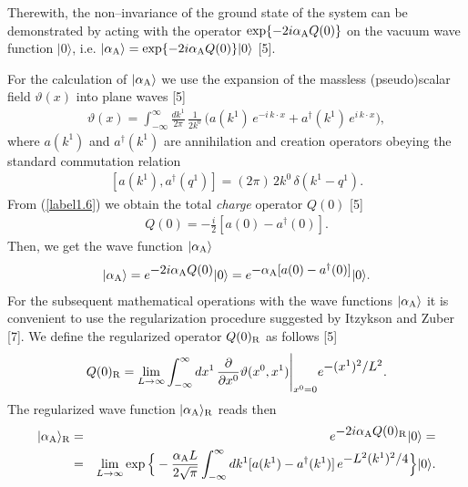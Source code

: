 \documentclass[a4paper,12pt] {article}
\begin{document}
Therewith, the non--invariance of the ground state of the system can
be demonstrated by acting with the operator $\exp\{-2i\alpha_{\rm
A}Q(0)\}$ on the vacuum wave function $|0\rangle$, i.e. $|\alpha_{\rm
A}\rangle = \exp\{-2i\alpha_{\rm A}Q(0)\}|0\rangle$ [5].

For the calculation of $|\alpha_{\rm A}\rangle$ we use the expansion
of the massless (pseudo)scalar field $\vartheta(x)$ into plane waves
[5]
%
\begin{eqnarray}\label{label1.7}
\vartheta(x) =
\int^{\infty}_{-\infty}\frac{dk^1}{2\pi}\,\frac{1}{2k^0}\,
\Big(a(k^1)\,e^{\textstyle -i\,k\cdot x} +
a^{\dagger}(k^1)\,e^{\textstyle i\,k\cdot x}\Big),
\end{eqnarray}
%
where $a(k^1)$ and $a^{\dagger}(k^1)$ are annihilation and creation
operators obeying the standard commutation relation
%
\begin{eqnarray}\label{label1.8}
[a(k^1), a^{\dagger}(q^1)] = (2\pi)\,2k^0\,\delta(k^1 - q^1).
\end{eqnarray}
%
From (\ref{label1.6}) we obtain the total {\it charge} operator $Q(0)$
[5]
%
\begin{eqnarray}\label{label1.9}
Q(0) = -\frac{i}{2}[a(0) - a^{\dagger}(0)].
\end{eqnarray}
%
Then, we get the wave function $|\alpha_{\rm A}\rangle$
%
\begin{eqnarray}\label{label1.10}
|\alpha_{\rm A}\rangle = e^{\textstyle -2i\alpha_{\rm A}Q(0)}|0\rangle
  = e^{\textstyle - \alpha_{\rm A}[a(0) - a^{\dagger}(0)]}|0\rangle.
\end{eqnarray}
%
For the subsequent mathematical operations with the wave functions
$|\alpha_{\rm A}\rangle$ it is convenient to use the regularization
procedure suggested by Itzykson and Zuber [7]. We define the
regularized operator $Q(0)_{\rm R}$ as follows [5]
%
\begin{eqnarray}\label{label1.11}
Q(0)_{\rm R} = \lim_{L \to
\infty}\int^{\infty}_{-\infty}dx^1\,\frac{\partial}{\partial
x^0}\vartheta(x^0,x^1)\Bigg|_{x^0=0}e^{\textstyle - (x^1)^2/L^2}.
\end{eqnarray}
%
The regularized wave function $|\alpha_{\rm A}\rangle_{\rm R}$ reads
then
%
\begin{eqnarray}\label{label1.12}
|\alpha_{\rm A}\rangle_{\rm R} &=& e^{\textstyle -2i\alpha_{\rm
  A}Q(0)_{\rm R}}|0\rangle = \nonumber\\ &=&\lim_{L \to
  \infty}\exp\Big\{ -\frac{\alpha_{\rm
  A}L}{2\sqrt{\pi}}\int^{\infty}_{-\infty}dk^1[a(k^1) -
  a^{\dagger}(k^1)]\,e^{\textstyle - L^2(k^1)^2/4}\Big\}|0\rangle.
\end{eqnarray}
\end{document}
